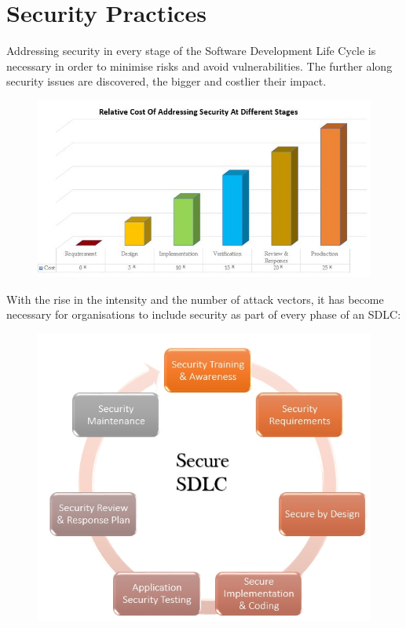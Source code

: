 \documentclass[a5paper,pagesize,10pt,bibtotoc,DIV=10,twoside]{scrbook}
\begin{document}
\newpage
\section{Security Practices}

Addressing security in every stage of the Software Development Life Cycle is necessary in order to minimise risks and avoid vulnerabilities. The further along security issues are discovered, the bigger and costlier their impact.\\
\begin{figure}[H]
\hspace*{-1cm} 
\includegraphics[scale=0.53]{images/sdlc2} \cite{sdlc}
\end{figure}

With the rise in the intensity and the number of attack vectors, it has become necessary for organisations to include security as part of every phase of an SDLC:\\
\begin{figure}[H]
\includegraphics[scale=0.5]{images/ssdlc1}
\end{figure}
\end{document}
